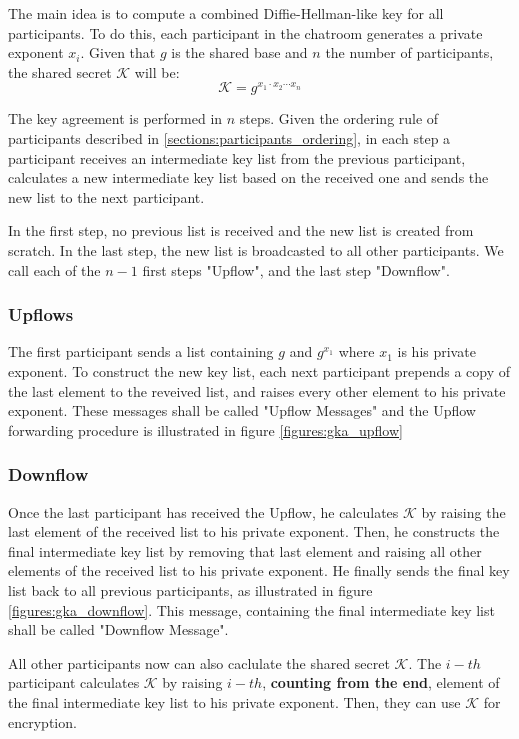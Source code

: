 The main idea is to compute a combined Diffie-Hellman-like key for all participants. To do this, each participant in the chatroom generates a private exponent $x_i$. Given that $g$ is the shared base and $n$ the number of participants, the shared secret $\mathcal{K}$ will be: 
\[
\mathcal{K} = g^{x_1 \cdot x_2 \cdots x_n}
\]

The key agreement is performed in $n$ steps. Given the ordering rule of participants described in \ref{sections:participants_ordering}, in each step a participant receives an intermediate key list from the previous participant, calculates a new intermediate key list based on the received one and sends the new list to the next participant.

In the first step, no previous list is received and the new list is created from scratch. In the last step, the new list is broadcasted to all other participants. We call each of the $n-1$ first steps "Upflow", and the last step "Downflow".

\subsubsection{Upflows}
The first participant sends a list containing $g$ and $g^{x_1}$ where $x_1$ is his private exponent. To construct the new key list, each next participant prepends a copy of the last element to the reveived list, and raises every other element to his private exponent. These messages shall be called "Upflow Messages" and the Upflow forwarding procedure is illustrated in figure \ref{figures:gka_upflow}
 
\subsubsection{Downflow}
Once the last participant has received the Upflow, he calculates $\mathcal{K}$ by raising the last element of the received list to his private exponent. Then, he constructs the final intermediate key list by removing that last element and raising all other elements of the received list to his private exponent. He finally sends the final key list back to all previous participants, as illustrated in figure \ref{figures:gka_downflow}. This message, containing the final intermediate key list shall be called "Downflow Message".

All other participants now can also caclulate the shared secret $\mathcal{K}$. The $i-th$ participant calculates $\mathcal{K}$ by raising $i-th$, {\bf counting from the end}, element of the final intermediate key list to his private exponent. Then, they can use $\mathcal{K}$ for encryption.

